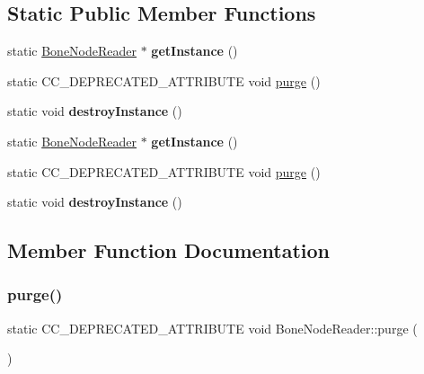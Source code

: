 \subsection*{Static Public Member Functions}
\begin{DoxyCompactItemize}
\item 
\mbox{\label{classBoneNodeReader_a0dc09d7222ba64a9ba012bc1cb2e2ed2}} 
static \hyperlink{classBoneNodeReader}{Bone\+Node\+Reader} $\ast$ {\bfseries get\+Instance} ()
\item 
static C\+C\+\_\+\+D\+E\+P\+R\+E\+C\+A\+T\+E\+D\+\_\+\+A\+T\+T\+R\+I\+B\+U\+TE void \hyperlink{classBoneNodeReader_a66289ba52e63fd281967b75781cb16bc}{purge} ()
\item 
\mbox{\label{classBoneNodeReader_a42f0e832db9e11af1af6c8794ef8f3ee}} 
static void {\bfseries destroy\+Instance} ()
\item 
\mbox{\label{classBoneNodeReader_a716e42c66b48d19dfecd91fbb5938094}} 
static \hyperlink{classBoneNodeReader}{Bone\+Node\+Reader} $\ast$ {\bfseries get\+Instance} ()
\item 
static C\+C\+\_\+\+D\+E\+P\+R\+E\+C\+A\+T\+E\+D\+\_\+\+A\+T\+T\+R\+I\+B\+U\+TE void \hyperlink{classBoneNodeReader_a66289ba52e63fd281967b75781cb16bc}{purge} ()
\item 
\mbox{\label{classBoneNodeReader_a24f5f4d56f77c7d018c47ba83850d4aa}} 
static void {\bfseries destroy\+Instance} ()
\end{DoxyCompactItemize}


\subsection{Member Function Documentation}
\mbox{\label{classBoneNodeReader_a66289ba52e63fd281967b75781cb16bc}} 
\subsubsection{\texorpdfstring{purge()}{purge()}\hspace{0.1cm}{\footnotesize\ttfamily [1/2]}}
{\footnotesize\ttfamily static C\+C\+\_\+\+D\+E\+P\+R\+E\+C\+A\+T\+E\+D\+\_\+\+A\+T\+T\+R\+I\+B\+U\+TE void Bone\+Node\+Reader\+::purge (\begin{DoxyParamCaption}{ }\end{DoxyParamCaption})\hspace{0.3cm}{\ttfamily [static]}}

